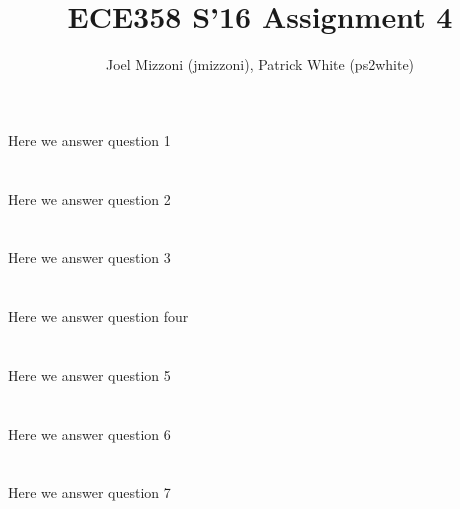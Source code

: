 \documentclass[10pt,a4paper]{article}
\author{Joel Mizzoni (jmizzoni), Patrick White (ps2white)}
\begin{document}
\title{ECE358 S'16 Assignment 4}
\maketitle
\section{}
Here we answer question 1
\section{}
Here we answer question 2
\section{}
Here we answer question 3
\section{}
Here we answer question four
\section{}
Here we answer question 5
\section{}
Here we answer question 6
\section{}
Here we answer question 7
\end{document}
